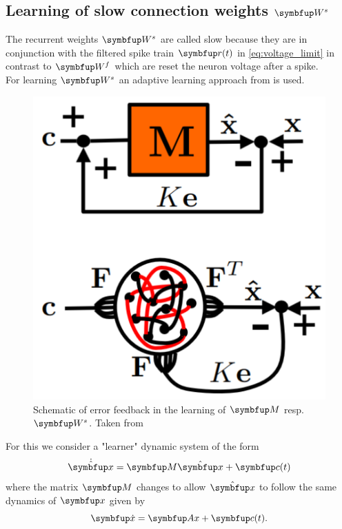 \subsection{Learning of slow connection weights $\bmu{W}^s$}
The recurrent weights $\bmu{W}^s$ are called slow because they are in conjunction with the filtered spike train $\bmu{r}(t)$ in \cref{eq:voltage_limit} in contrast to $\bmu{W}^f$ which are reset the neuron voltage after a spike.\\
For learning $\bmu{W}^s$ an adaptive learning approach from \cite{bourdoukan_enforcing_2015} is used.\\
\begin{figure}[H]
	\centering
	\includegraphics[scale = 0.15]{screenshots/error_feedback_Ws.png}
	\caption{Schematic of error feedback in the learning of $\bmu{M}$ resp. $\bmu{W}^s$. Taken from \cite{bourdoukan_enforcing_2015}}
	\label{fig:error_feedback_Ws}
\end{figure}
For this we consider a "learner" dynamic system of the form
\begin{equation}
	\dot{\hat{\bmu{x}}} = \bmu{M}\hat{\bmu{x}} + \bmu{c}(t)
\end{equation}
where the matrix $\bmu{M}$ changes to allow $\hat{\bmu{x}}$ to follow the same dynamics of $\bmu{x}$ given by
\begin{equation}\label{eq:teacher}
	\bmu{\dot{x}} = \bmu{Ax} + \bmu{c}(t).
\end{equation}
